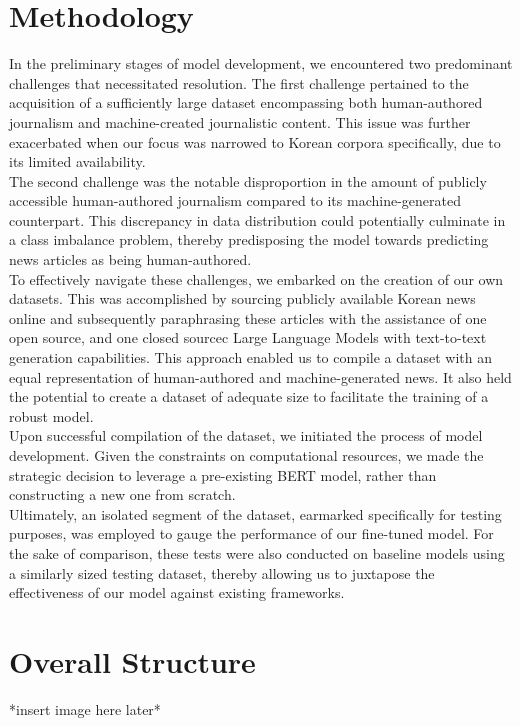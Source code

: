 \documentclass{article}
\begin{document}
\section{Methodology}
\null\quad In the preliminary stages of model development, we encountered two predominant challenges that necessitated resolution.
The first challenge pertained to the acquisition of a sufficiently large dataset encompassing both human-authored journalism and machine-created journalistic content.
This issue was further exacerbated when our focus was narrowed to Korean corpora specifically, due to its limited availability. \\
\null\quad The second challenge was the notable disproportion in the amount of publicly accessible human-authored journalism compared to its machine-generated counterpart.
This discrepancy in data distribution could potentially culminate in a class imbalance problem,
thereby predisposing the model towards predicting news articles as being human-authored. \\
\null\quad To effectively navigate these challenges, we embarked on the creation of our own datasets.
This was accomplished by sourcing publicly available Korean news online and subsequently paraphrasing these articles with the assistance of one open source, and one closed sourcec Large Language Models with text-to-text generation capabilities.
This approach enabled us to compile a dataset with an equal representation of human-authored and machine-generated news.
It also held the potential to create a dataset of adequate size to facilitate the training of a robust model. \\
\null\quad Upon successful compilation of the dataset, we initiated the process of model development.
Given the constraints on computational resources, we made the strategic decision to leverage a pre-existing BERT model, rather than constructing a new one from scratch. \\
\null\quad Ultimately, an isolated segment of the dataset, earmarked specifically for testing purposes, was employed to gauge the performance of our fine-tuned model.
For the sake of comparison, these tests were also conducted on baseline models using a similarly sized testing dataset,
thereby allowing us to juxtapose the effectiveness of our model against existing frameworks.

\section{Overall Structure}
*insert image here later*
\end{document}
